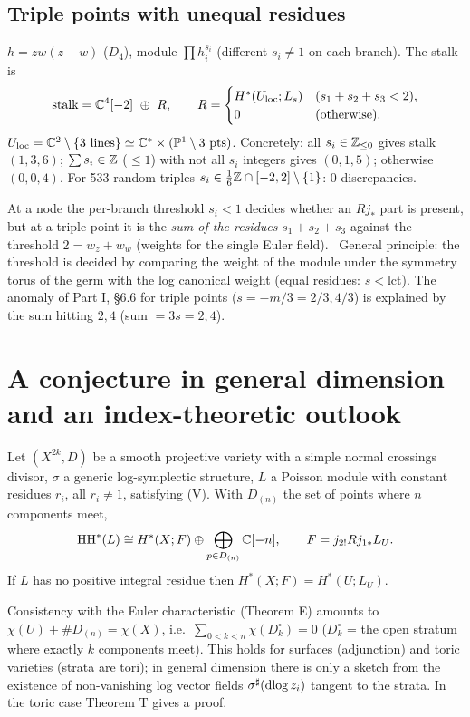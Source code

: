 \subsection{Triple points with unequal residues}
\begin{obs}[\tV]\label{obs:triple}
$h=zw(z-w)$ ($D_4$), module $\prod h_i^{s_i}$ (different $s_i\ne1$ on each branch). The stalk is
\[\text{stalk}=\mathbb C^4[-2]\ \oplus\ R,\qquad R=\begin{cases}H^*(U_{\rm loc};L_s)&(s_1+s_2+s_3<2),\\0&(\text{otherwise}).\end{cases}\]
$U_{\rm loc}=\mathbb C^2\setminus\{3\text{ lines}\}\simeq\mathbb C^*\times(\mathbb P^1\setminus3\text{ pts})$. Concretely: all $s_i\in\mathbb Z_{\le0}$ gives stalk $(1,3,6)$; $\sum s_i\in\mathbb Z$ ($\le1$) with not all $s_i$ integers gives $(0,1,5)$; otherwise $(0,0,4)$. For 533 random triples $s_i\in\tfrac16\mathbb Z\cap[-2,2]\setminus\{1\}$: 0 discrepancies.
\end{obs}
At a node the per-branch threshold $s_i<1$ decides whether an $Rj_*$ part is present, but at a triple point it is the \emph{sum of the residues} $s_1+s_2+s_3$ against the threshold $2=w_z+w_w$ (weights for the single Euler field). \tK\ General principle: the threshold is decided by comparing the weight of the module under the symmetry torus of the germ with the log canonical weight (equal residues: $s<\mathrm{lct}$). The anomaly of Part I, \S6.6 for triple points ($s=-m/3=2/3,4/3$) is explained by the sum hitting $2,4$ (sum $=3s=2,4$).

\section{A conjecture in general dimension and an index-theoretic outlook}\label{sec:conj}
\begin{conj}\tK\label{conj:gen}
Let $(X^{2k},D)$ be a smooth projective variety with a simple normal crossings divisor, $\sigma$ a generic log-symplectic structure, $L$ a Poisson module with constant residues $r_i$, all $r_i\ne1$, satisfying (V). With $D_{(n)}$ the set of points where $n$ components meet,
\[\mathrm{HH}^*(L)\cong H^*(X;F)\oplus\bigoplus_{p\in D_{(n)}}\mathbb C[-n],\qquad F=j_{2!}Rj_{1*}L_U.\]
If $L$ has no positive integral residue then $H^*(X;F)=H^*(U;L_U)$.
\end{conj}
Consistency with the Euler characteristic (Theorem E) amounts to $\chi(U)+\#D_{(n)}=\chi(X)$, i.e.\ $\sum_{0<k<n}\chi(D_k^\circ)=0$ ($D_k^\circ$ = the open stratum where exactly $k$ components meet). This holds for surfaces (adjunction) and toric varieties (strata are tori)\tP; in general dimension there is only a sketch from the existence of non-vanishing log vector fields $\sigma^\sharp(\mathrm{dlog}\, z_i)$ tangent to the strata\tK. In the toric case Theorem T gives a proof.

